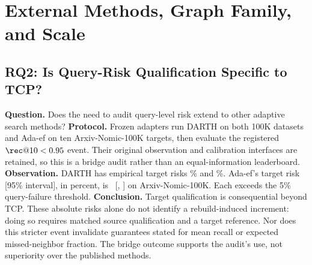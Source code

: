 \section{External Methods, Graph Family, and Scale}
\label{sec:families}

\subsection{RQ2: Is Query-Risk Qualification Specific to TCP?}
\textbf{Question.} Does the need to audit query-level risk extend to other adaptive search methods?
\textbf{Protocol.} Frozen adapters run DARTH on both 100K datasets and Ada-ef on ten Arxiv-Nomic-100K targets, then evaluate the registered $\rec@10<0.95$ event. Their original observation and calibration interfaces are retained, so this is a bridge audit rather than an equal-information leaderboard.
\textbf{Observation.} DARTH has empirical target risks \WZeroDarthSiftRisk\% and \WZeroDarthArxivRisk\%. Ada-ef's target risk [95\% interval], in percent, is \WZeroAdaefArxivRisk\ [\WZeroAdaefArxivRiskLow, \WZeroAdaefArxivRiskHigh] on Arxiv-Nomic-100K. Each exceeds the 5\% query-failure threshold.
\textbf{Conclusion.} Target qualification is consequential beyond TCP. These absolute risks alone do not identify a rebuild-induced increment: doing so requires matched source qualification and a target reference. Nor does this stricter event invalidate guarantees stated for mean recall or expected missed-neighbor fraction. The bridge outcome supports the audit's use, not superiority over the published methods.

